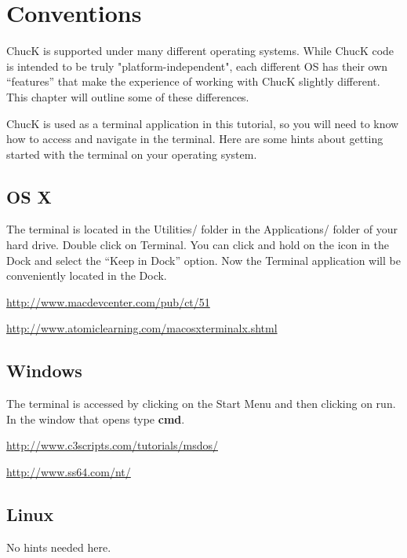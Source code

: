 \section{Conventions}

ChucK is supported under many different operating systems. While ChucK code is intended to be truly "platform-independent", each different OS has their own ``features'' that make the experience of working with ChucK slightly different. This chapter will outline some of these differences. 

ChucK is used as a terminal application in this tutorial, so you will need to know how to access and navigate in the terminal. Here are some hints about getting started with the terminal on your operating system.


\subsection{OS X}

The terminal is located in the Utilities/ folder in the Applications/ folder of your hard drive. Double click on Terminal. You can click and hold on the icon in the Dock and select the ``Keep in Dock'' option. Now the Terminal application will be conveniently located in the Dock. 

\href{http://www.macdevcenter.com/pub/ct/51}{http://www.macdevcenter.com/pub/ct/51}

\href{http://www.atomiclearning.com/macosxterminalx.shtml}{http://www.atomiclearning.com/macosxterminalx.shtml}

\subsection{Windows}

The terminal is accessed by clicking on the Start Menu and then clicking on run. In the window that opens type {\bf cmd}. 

\href{http://www.c3scripts.com/tutorials/msdos/}{http://www.c3scripts.com/tutorials/msdos/}

\href{http://www.ss64.com/nt/}{http://www.ss64.com/nt/}

\subsection{Linux}

No hints needed here.
